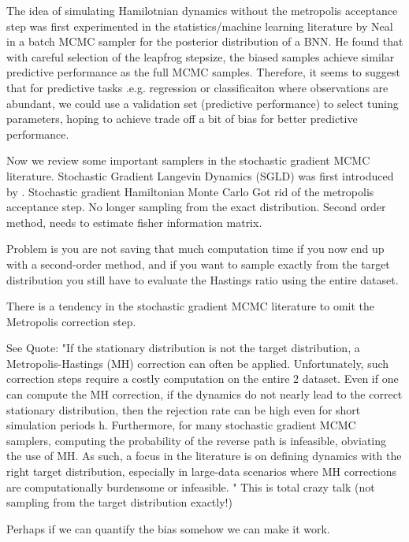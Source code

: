 \documentclass{book}
\begin{document}
\begin{enumerate}
The idea of simulating Hamilotnian dynamics without the metropolis acceptance step was first experimented in the statistics/machine learning literature by Neal \cite{neal1993bayesian} in a batch MCMC sampler for the posterior distribution of a BNN. He found that with careful selection of the leapfrog stepsize, the biased samples achieve similar predictive performance as the full MCMC samples. Therefore, it seems to suggest that for predictive tasks .e.g. regression or classificaiton where observations are abundant, we could 
use a validation set (predictive performance) to select tuning parameters, hoping to achieve trade off a bit of bias for better predictive performance. 

Now we review some important samplers in the stochastic gradient MCMC
literature. Stochastic Gradient Langevin Dynamics (SGLD) was first introduced by
\cite{welling2011bayesian}. 
Stochastic gradient Hamiltonian Monte Carlo
Got rid of the metropolis acceptance step. No longer sampling from the exact
distribution. Second order method, needs to estimate fisher information matrix.

\cite{chen2014stochastic}

Problem is you are not saving that much computation time if you now end up with a second-order method, and if you want to sample exactly from the target distribution you still have to evaluate the Hastings ratio using the entire dataset.

There is a tendency in the stochastic gradient MCMC literature to omit the Metropolis correction step.

See \cite{ding2014bayesian} 
Quote: "If the stationary distribution is not the target distribution, a Metropolis-Hastings (MH) correction can often be applied. Unfortunately, such correction steps require a costly computation on the entire
2
dataset. Even if one can compute the MH correction, if the dynamics do not nearly lead to the correct stationary distribution, then the rejection rate can be high even for short simulation periods h. Furthermore, for many stochastic gradient MCMC samplers, computing the probability of the reverse path is infeasible, obviating the use of MH. As such, a focus in the literature is on defining dynamics with the right target distribution, especially in large-data scenarios where MH corrections are computationally burdensome or infeasible.
"
\cite{ma2015complete}
This is total crazy talk (not sampling from the target distribution exactly!)

Perhaps if we can quantify the bias somehow we can make it work.


\end{enumerate}
\end{document}
